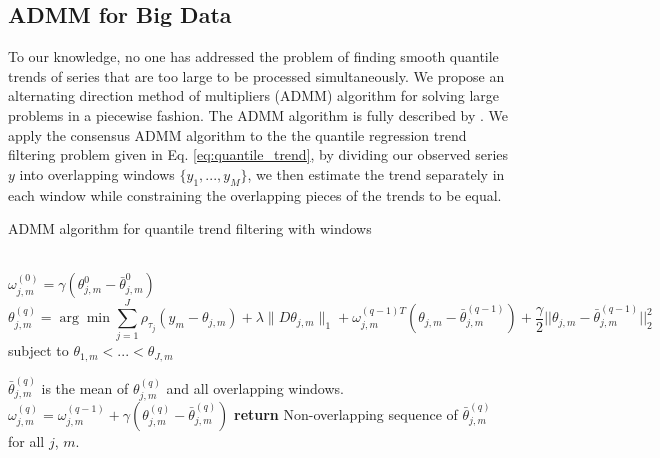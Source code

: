 \documentclass[12pt]{article}
\begin{document}
	\subsection{ADMM for Big Data}
	
	To our knowledge, no one has addressed the problem of finding smooth quantile trends of series that are too large to be processed simultaneously. We propose an alternating direction method of multipliers (ADMM) algorithm for solving large problems in a piecewise fashion. The ADMM algorithm is fully described by \cite{boyd2011distributed, gabay1975dual, glowinski1975approximation}. We apply the consensus ADMM algorithm to the the quantile regression trend filtering problem given in Eq. \ref{eq:quantile_trend}, by dividing our observed series $y$ into overlapping windows $\{y_1, ..., y_M\}$, we then estimate the trend separately in each window while constraining the overlapping pieces of the trends to be equal. 
	 

	\begin{algorithm}
		\caption{ADMM algorithm for quantile trend filtering with windows}\label{euclid}
		\begin{algorithmic}
			\\
			 	 $\omega_{j,m}^{(0)} = \gamma(\theta_{j,m}^0 - \bar{\theta}_{j,m}^0)$	
			\Repeat{}
			 $$
		\theta_{j,m}^{(q)} = \arg \min \sum_{j=1}^J\rho_{\tau_j}(y_m - \theta_{j,m})+\lambda \lVert D\theta_{j,m}\rVert_1 +  \omega_{j,m}^{(q-1)T}(\theta_{j,m} - \bar{\theta}_{j,m}^{(q-1)}) + 
			\frac{\gamma}{2}||\theta_{j,m} - \bar{\theta}_{j,m}^{(q-1)}||_2^2
			$$
			\qquad \qquad subject to $\theta_{1,m} < ...<\theta_{J,m}$
						
			\State  $\bar{\theta}_{j,m}^{(q)}$ is the mean of $\theta_{j,m}^{(q)}$ and all overlapping windows.
			\State $\omega_{j,m}^{(q)} = \omega_{j,m}^{(q-1)} + \gamma(\theta_{j,m}^{(q)} - \bar{\theta}_{j,m}^{(q)})$	
			\State \textbf{return} Non-overlapping sequence of $\bar{\theta}_{j,m}^{(q)}$ for all $j$, $m$.
			
		\end{algorithmic}
	\end{algorithm}
\end{document}
